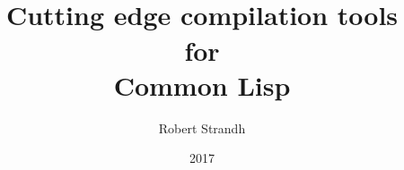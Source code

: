\documentclass[11pt]{book}
\title{{\Huge \sysname{}}\\
Cutting edge compilation tools\\
for\\
Common Lisp}
\author{Robert Strandh}
\date{2017}
\def\inputtex#1{}
\begin{document}

\maketitle

\newpage

{\setlength{\parskip}{0cm}
\tableofcontents}

\inputtex{chap-intro.tex}
\inputtex{chap-environment.tex}
\inputtex{chap-primitive-operations.tex}
\inputtex{chap-concrete-syntax-tree.tex}
\inputtex{chap-abstract-syntax-tree.tex}
\inputtex{chap-ir.tex}
\inputtex{chap-translating-ast-to-hir.tex}
\inputtex{chap-policy.tex}
\inputtex{chap-optimizations.tex}
\inputtex{chap-low-level-optimizations.tex}
\inputtex{chap-backends.tex}
\inputtex{chap-metering.tex}

{}


\printindex
\end{document}
